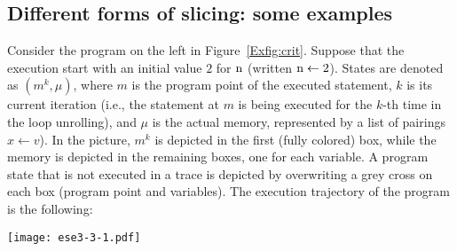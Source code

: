 \documentclass[prodmode,acmtocl]{acmsmall}
\def\memory{\ensuremath{\mu}\xspace}
\newcommand{\la}{\leftarrow}
\newcommand{\0}{\mbox{\bf 0}}
\newcommand{\CODE}[1]{\ensuremath{\mbox{\lstinline!#1!}\xspace}\xspace}
\def\nn{\CODE{n}}
\begin{document}
\subsection*{Different forms of slicing: some examples}
\begin{example}\label{Ex:crit}
  Consider the program on the left in Figure~\ref{Exfig:crit}.
  Suppose that the execution start with an initial value $2$ for
  \CODE{n} (written $\mbox{\nn}\la 2$).  States are denoted as
  $(m^k,\memory)$, where $m$ is the program point of the executed statement, $k$ is its
  current iteration (i.e., the statement at $m$ is being executed for the $k$-th time in the loop unrolling),
  and $\memory$ is the actual memory, represented by a list of
  pairings $x\la v$). In the picture, $m^k$ is depicted in the first (fully colored) box, while the memory is depicted in the remaining boxes, one for each variable. A program state that is not executed in a trace is depicted by overwriting a grey cross on each box (program point and variables).
The execution trajectory of the program is the following:
\begin{center}
\texttt{[image: ese3-3-1.pdf]}
\end{center}
  

\end{example}
\end{document}
